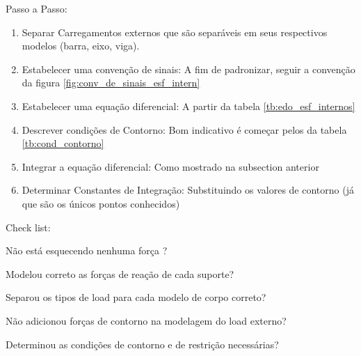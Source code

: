 \documentclass{article}
\begin{document}
        \begin{minipage}[t]{.7\textwidth}
            Passo a Passo:
            \begin{enumerate}\addtocounter{enumi}{-1}\tiny
                \item Separar Carregamentos externos que são separáveis em seus respectivos modelos (barra, eixo, viga).
                \item Estabelecer uma convenção de sinais: A fim de padronizar, seguir a convenção da figura \ref{fig:conv_de_sinais_esf_intern}
                \item Estabelecer uma equação diferencial: A partir da tabela \ref{tb:edo_esf_internos}
                \item Descrever condições de Contorno: Bom indicativo é começar pelos da tabela \ref{tb:cond_contorno}
                \item Integrar a equação diferencial: Como mostrado na subsection anterior
                \item Determinar Constantes de Integração: Substituindo os valores de contorno (já que são os únicos pontos conhecidos)
            \end{enumerate}
        \end{minipage}\hfill
        \begin{minipage}[t]{.3\textwidth}
            Check list: 
            \begin{todolist}\tiny
                \item Não está esquecendo nenhuma força ?
                \item Modelou correto as forças de reação de cada suporte?
                \item Separou os tipos de load para cada modelo de corpo correto?
                \item Não adicionou forças de contorno na modelagem do load externo?
                \item Determinou as condições de contorno e de restrição necessárias?
            \end{todolist}
        \end{minipage}




    
\end{document}
